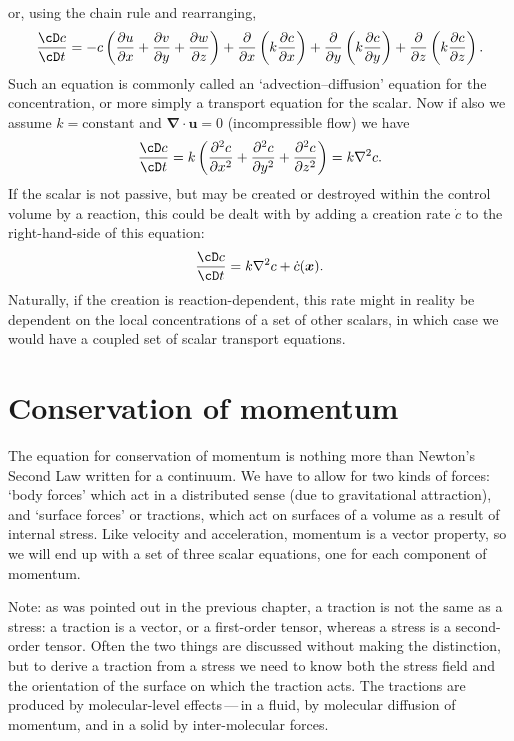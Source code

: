 \documentclass[twoside,11pt]		{report}
\begin{document}
or, using the chain rule and rearranging,
\begin{equation}
\frac{\cD c}{\cD t}=
-c\left(\frac{\partial u}{\partial x}+\frac{\partial v}{\partial
  y}+\frac{\partial w}{\partial z}\right) + \frac{\partial}{\partial
  x}\left(k\frac{\partial c}{\partial x}\right)+ \frac{\partial}{\partial
  y}\left(k\frac{\partial c}{\partial y}\right)+ \frac{\partial}{\partial
  z}\left(k\frac{\partial c}{\partial z}\right).
\end{equation}
Such an equation is commonly called an `advection--diffusion' equation
for the concentration, or more simply a transport equation for the
scalar.  Now if also we assume $k=\textrm{constant}$ and
$\bm{\nabla\cdot u}=0$ (incompressible flow) we have
\begin{equation}
\frac{\cD c}{\cD t}=
k\left(\frac{\partial^2 c}{\partial x^2} + \frac{\partial^2
  c}{\partial y^2}+ \frac{\partial^2 c}{\partial z^2}\right)=
k\nabla^2 c.
\end{equation}
If the scalar is not passive, but may be created or destroyed within
the control volume by a reaction, this could be dealt with by adding a
creation rate $\dot{c}$ to the right-hand-side of this equation:
\begin{equation}
\frac{\cD c}{\cD t}=
k\nabla^2 c + \dot{c}(\bm{x}).
\end{equation}
Naturally, if the creation is reaction-dependent, this rate might in
reality be dependent on the local concentrations of a set of other
scalars, in which case we would have a coupled set of scalar transport
equations.

\section{Conservation of momentum}

The equation for conservation of momentum is nothing more than
Newton's Second Law written for a continuum. We have to allow for
two kinds of forces: `body forces' which act in a distributed sense
(\eg due to gravitational attraction), and `surface forces' or
tractions, which act on surfaces of a volume as a result of internal
stress.  Like velocity and acceleration, momentum is a vector
property, so we will end up with a set of three scalar equations, one
for each component of momentum.

Note: as was pointed out in the previous chapter, a traction is not
the same as a stress: a traction is a vector, or a first-order tensor,
whereas a stress is a second-order tensor. Often the two things are
discussed without making the distinction, but to derive a traction
from a stress we need to know both the stress field and the
orientation of the surface on which the traction acts. The tractions
are produced by molecular-level effects\,---\,in a fluid, by molecular
diffusion of momentum, and in a solid by inter-molecular forces.
\end{document}

